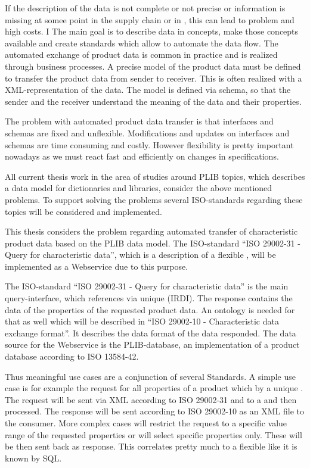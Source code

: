 If the description of the data is not complete or not precise or information is missing at somee point in the supply chain or in  , this can lead to problem and high costs. I
The main goal is to describe data in concepts, make those concepts available and create standards which allow to automate the data flow. The automated exchange of product data is common in practice and is realized through business processes. A precise model of the product data must be defined to transfer the product data from sender to receiver. This is often realized with a XML-representation of the data. The model is defined via schema, so that the sender and the receiver understand the meaning of the data and their properties. 

The problem with automated product data transfer is that interfaces and schemas are fixed and unflexible. Modifications and updates on interfaces and schemas are time consuming and costly. However flexibility is pretty important nowadays as we must react fast and efficiently on changes in specifications. 
 
All current thesis work in the area of studies around \gls{PLIB} topics, which describes a data model for dictionaries and libraries, consider the above mentioned problems. To support solving the problems several ISO-standards regarding these topics will be considered and implemented. 

This thesis considers the problem regarding automated transfer of characteristic product data based on the \gls{PLIB} data model. The ISO-standard \enquote{ISO 29002-31 - Query for characteristic data}, which is a description of a flexible , will be implemented as a \gls{Webservice} due to this purpose. 

The ISO-standard \enquote{ISO 29002-31 - Query for characteristic data} is the main query-interface, which references  via unique  (IRDI).
The response contains the data of the properties of the requested product data. An ontology is needed for that as well which will be described in \enquote{ISO 29002-10 - Characteristic data exchange format}. It describes the data format of the data responded. The data source for the \gls{Webservice} is the PLIB-database, an implementation of a product database according to ISO 13584-42. 

Thus meaningful use cases are a conjunction of several Standards. 
A simple use case is for example the request for all properties of a product which by a unique . The request will be sent via XML according to ISO 29002-31 and to a  and then processed. The response will be sent according to ISO 29002-10 as an XML file to the consumer. More complex cases will restrict the request to a specific value range of the requested properties or will select specific properties only. These will be then sent back as response. This  correlates pretty much to a flexible  like it is known by SQL. 

